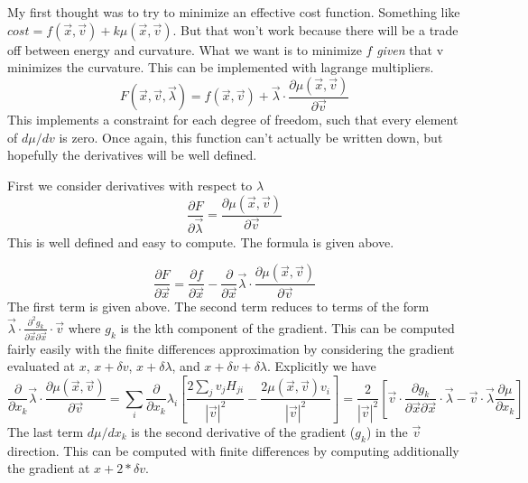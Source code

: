 \documentclass[a4paper]{article}
\begin{document}
My first thought was to try to minimize an effective cost function.  Something like $cost = f(\vec{x}, \vec{v}) + k \mu(\vec{x}, \vec{v})$.
But that won't work because there will be a trade off between energy and curvature.  What we want is to minimize $f$ \emph{given} that v
minimizes the curvature.  This can be implemented with lagrange multipliers.
\begin{equation}
F(\vec{x}, \vec{v}, \vec{\lambda}) = f(\vec{x}, \vec{v}) + \vec{\lambda} \cdot \frac{\partial \mu(\vec{x}, \vec{v})}{\partial \vec{v}}
\end{equation}
This implements a constraint for each degree of freedom, such that every element of $d\mu /dv$ is zero.
Once again, this function can't actually be written down, but hopefully the derivatives will be well defined.

First we consider derivatives with respect to $\lambda$
\begin{equation}
\frac{\partial F}{\partial \vec{\lambda}} = \frac{\partial \mu(\vec{x}, \vec{v})}{\partial \vec{v}}
\end{equation}
This is well defined and easy to compute.  The formula is given above.  


\begin{equation}
\frac{\partial F}{\partial \vec{x}} = \frac{\partial f}{\partial \vec{x}} -
\frac{\partial}{\partial \vec{x}} \vec{\lambda} \cdot \frac{\partial
\mu(\vec{x}, \vec{v})}{\partial \vec{v}}
\end{equation}
The first term is given above.  The second term reduces to terms of the form
$\vec{\lambda} \cdot \frac{\partial^2 g_k}{\partial \vec{x} \partial \vec{x}} \cdot \vec{v}$ where $g_k$ is the kth component
of the gradient.  This can be computed fairly easily
with the finite differences approximation by considering the gradient evaluated at 
$x$,
$x+\delta v$,
$x+\delta \lambda$, and
$x+\delta v + \delta \lambda$.
Explicitly we have 
\begin{equation}
\frac{\partial}{\partial x_k} \vec{\lambda} \cdot \frac{\partial
\mu(\vec{x}, \vec{v})}{\partial \vec{v}} =
\sum_{i} \frac{\partial}{\partial x_k} \lambda_i 
\left[
\frac{ 2 \sum_j v_j H_{ji}}{|\vec{v}|^2}
-
\frac{2 \mu(\vec{x}, \vec{v}) v_i}{|\vec{v}|^2}
\right]
=
\frac{ 2}{|\vec{v}|^2}
\left[
\vec{v}
\cdot
\frac{\partial g_k}{\partial \vec{x} \partial \vec{x}}
\cdot
\vec{\lambda}
-
\vec{v}
\cdot
\vec{\lambda}
\frac{\partial \mu}{\partial x_k}
\right]
\end{equation}
The last term $d\mu / dx_k$ is the second derivative of the gradient ($g_k$) in the $\vec{v}$ direction.
This can be computed with finite differences by computing additionally the gradient at $x + 2*\delta v$.
\end{document}
